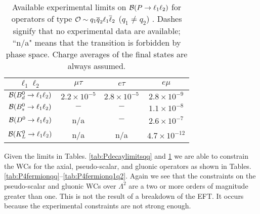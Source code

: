 \documentclass[12pt]{article}
\begin{document}
\begin{table*}
\begin{center}
\footnotesize
\begin{tabular}{cccc}
\hline \hline
$\ell_1 \ell_2$& $\mu \tau$ & $e \tau$ & $e \mu$  \\ 
\hline
%
${\cal B}(B^0_d \to \ell_1 \ell_2)$ & $2.2 \times 10^{-5}$ & $2.8 \times 10^{-5}$ & $2.8 \times 10^{-9}$ \\ 
%
${\cal B}(B^0_s \to \ell_1 \ell_2)$ & $-$ & $-$ & $1.1 \times 10^{-8}$ \\
%
${\cal B}(D^0 \to \ell_1 \ell_2)$ &  n/a & $-$ & $2.6 \times 10^{-7}$ \\
%
${\cal B}(K^0_L \to \ell_1 \ell_2)$ &  n/a &  n/a & $4.7 \times 10^{-12}$ \\
\hline \hline
\end{tabular}
\end{center}
\caption{\label{tab:Pdecaylimitsq1q2} Available experimental limits on ${\cal B}(P \to \ell_1 \ell_2)$ for operators of type ${\cal O} \sim q_1 \overline{q}_2 \ell_1 \overline{\ell}_2$ ($q_1 \neq q_2$) \cite{PDG}.
Dashes signify that no experimental data are available; ``n/a" means that the transition is forbidden by phase space. Charge averages of the final states are always assumed.}
\end{table*}


Given the limits in Tables. \ref{tab:Pdecaylimitsqq} and \ref{tab:Pdecaylimitsq1q2} we are able to constrain the WCs for the axial, pseudo-scalar, and gluonic operators as shown in Tables. \ref{tab:P4fermionqq}--\ref{tab:P4fermionq1q2}.  Again we see that the constraints on the pseudo-scalar and gluonic WCs over $\Lambda^2$ are a two or more orders of magnitude greater than one.  This is not the result of a breakdown of the EFT.  It occurs because the experimental constraints are not strong enough.  
\end{document}
